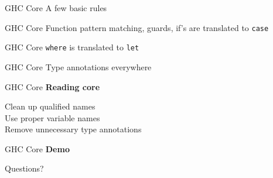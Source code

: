 \documentclass[20pt]{beamer}
\newcommand{\vspaced}{
    \vspace{5mm}
}
\begin{document}
\begin{frame}{GHC Core}
    A few basic rules
\end{frame}

\begin{frame}{GHC Core}
    Function pattern matching, guards, if's are translated to \texttt{case}
\end{frame}

\begin{frame}{GHC Core}
    \texttt{where} is translated to \texttt{let}
\end{frame}

\begin{frame}{GHC Core}
    Type annotations everywhere
\end{frame}

\begin{frame}{GHC Core}
    \textbf{Reading core} \\
    \vspaced
    Clean up qualified names \\
    Use proper variable names \\
    Remove unnecessary type annotations
\end{frame}

\begin{frame}{GHC Core}
    \textbf{Demo}
\end{frame}

\begin{frame}[plain]
    \begin{center}
    \huge{Questions?}
    \end{center}
\end{frame}
\end{document}
